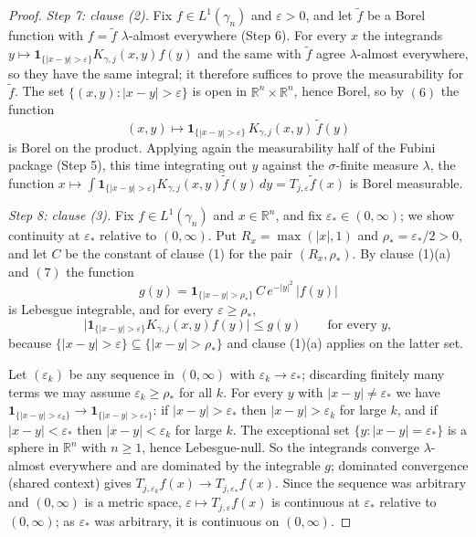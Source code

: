 \begin{proof}
\emph{Step 7: clause (2).}
Fix $f \in L^1(\gamma_n)$ and $\varepsilon > 0$, and let $\widetilde f$ be a
Borel function with $f = \widetilde f$ $\lambda$-almost everywhere (Step 6).
For every $x$ the integrands $y \mapsto \mathbf 1_{\{|x-y|>\varepsilon\}}
K_{\gamma,j}(x,y)f(y)$ and the same with $\widetilde f$ agree
$\lambda$-almost everywhere, so they have the same integral; it therefore
suffices to prove the measurability for $\widetilde f$.  The set
$\{(x,y) : |x-y| > \varepsilon\}$ is open in
$\mathbb{R}^n\times\mathbb{R}^n$, hence Borel, so by $(6)$ the function
\[
  (x,y) \longmapsto \mathbf 1_{\{|x-y|>\varepsilon\}}\,K_{\gamma,j}(x,y)\,
  \widetilde f(y)
\]
is Borel on the product.  Applying again the measurability half of the Fubini
package (Step 5), this time integrating out $y$ against the $\sigma$-finite
measure $\lambda$, the function
$x \mapsto \int \mathbf 1_{\{|x-y|>\varepsilon\}}K_{\gamma,j}(x,y)
 \widetilde f(y)\,dy = T_{j,\varepsilon}\widetilde f(x)$ is Borel measurable.

\emph{Step 8: clause (3).}
Fix $f \in L^1(\gamma_n)$ and $x \in \mathbb{R}^n$, and fix
$\varepsilon_* \in (0,\infty)$; we show continuity at $\varepsilon_*$ relative
to $(0,\infty)$.  Put $R_x = \max(|x|,1)$ and $\rho_* = \varepsilon_*/2 > 0$,
and let $C$ be the constant of clause (1) for the pair $(R_x,\rho_*)$.  By
clause (1)(a) and $(7)$ the function
\[
  g(y) = \mathbf 1_{\{|x-y|>\rho_*\}}\,C\,e^{-|y|^2}\,|f(y)|
\]
is Lebesgue integrable, and for every $\varepsilon \geq \rho_*$,
\[
  \bigl|\mathbf 1_{\{|x-y|>\varepsilon\}}K_{\gamma,j}(x,y)f(y)\bigr| \leq g(y)
  \qquad\text{for every } y ,
\]
because $\{|x-y|>\varepsilon\} \subseteq \{|x-y|>\rho_*\}$ and clause (1)(a)
applies on the latter set.

Let $(\varepsilon_k)$ be any sequence in $(0,\infty)$ with
$\varepsilon_k \to \varepsilon_*$; discarding finitely many terms we may assume
$\varepsilon_k \geq \rho_*$ for all $k$.  For every $y$ with
$|x-y| \neq \varepsilon_*$ we have
$\mathbf 1_{\{|x-y|>\varepsilon_k\}} \to \mathbf 1_{\{|x-y|>\varepsilon_*\}}$:
if $|x-y| > \varepsilon_*$ then $|x-y| > \varepsilon_k$ for large $k$, and if
$|x-y| < \varepsilon_*$ then $|x-y| < \varepsilon_k$ for large $k$.  The
exceptional set $\{y : |x-y| = \varepsilon_*\}$ is a sphere in $\mathbb{R}^n$
with $n \geq 1$, hence Lebesgue-null.  So the integrands converge
$\lambda$-almost everywhere and are dominated by the integrable $g$; dominated
convergence (shared context) gives
$T_{j,\varepsilon_k}f(x) \to T_{j,\varepsilon_*}f(x)$.  Since the sequence was
arbitrary and $(0,\infty)$ is a metric space, $\varepsilon \mapsto
T_{j,\varepsilon}f(x)$ is continuous at $\varepsilon_*$ relative to
$(0,\infty)$; as $\varepsilon_*$ was arbitrary, it is continuous on
$(0,\infty)$.
\end{proof}
